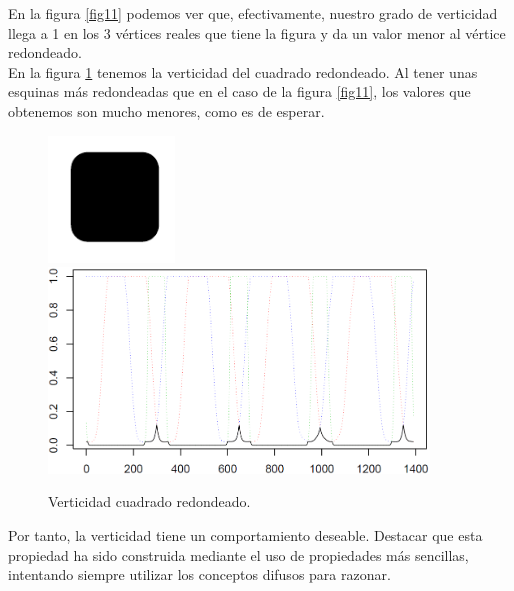 En la figura \ref{fig11} podemos ver que, efectivamente, nuestro grado de verticidad llega a 1 en los 3 vértices reales que tiene la figura y da un valor menor al vértice redondeado.\\

En la figura \ref{fig12} tenemos la verticidad del cuadrado redondeado. Al tener unas esquinas más redondeadas que en el caso de la figura \ref{fig11}, los valores que obtenemos son mucho menores, como es de esperar.\\

\begin{figure}[H]
\begin{center}

\includegraphics[width=0.3\textwidth]{img/device3-1.png}
\newline
\includegraphics[width=0.9\textwidth]{img/vert-dev3-1-limpio.png}
\end{center}

\caption{Verticidad cuadrado redondeado.}
\label{fig12}
\end{figure}

Por tanto, la verticidad tiene un comportamiento deseable. Destacar que esta propiedad ha sido construida mediante el uso de propiedades más sencillas, intentando siempre utilizar los conceptos difusos para razonar.\\

